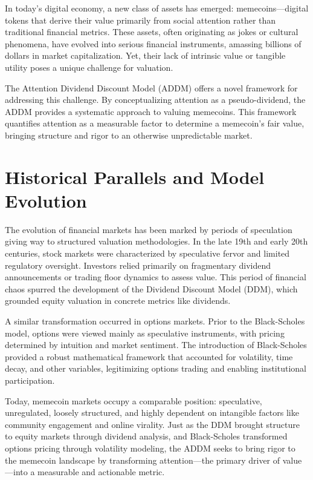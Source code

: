 \documentclass[a4paper,12pt]{article}
\begin{document}
In today's digital economy, a new class of assets has emerged: memecoins—digital tokens that derive their value primarily from social attention rather than traditional financial metrics. These assets, often originating as jokes or cultural phenomena, have evolved into serious financial instruments, amassing billions of dollars in market capitalization. Yet, their lack of intrinsic value or tangible utility poses a unique challenge for valuation.

The Attention Dividend Discount Model (ADDM) offers a novel framework for addressing this challenge. By conceptualizing attention as a pseudo-dividend, the ADDM provides a systematic approach to valuing memecoins. This framework quantifies attention as a measurable factor to determine a memecoin's fair value, bringing structure and rigor to an otherwise unpredictable market.

\section*{Historical Parallels and Model Evolution}

The evolution of financial markets has been marked by periods of speculation giving way to structured valuation methodologies. In the late 19th and early 20th centuries, stock markets were characterized by speculative fervor and limited regulatory oversight. Investors relied primarily on fragmentary dividend announcements or trading floor dynamics to assess value. This period of financial chaos spurred the development of the Dividend Discount Model (DDM), which grounded equity valuation in concrete metrics like dividends.

A similar transformation occurred in options markets. Prior to the Black-Scholes model, options were viewed mainly as speculative instruments, with pricing determined by intuition and market sentiment. The introduction of Black-Scholes provided a robust mathematical framework that accounted for volatility, time decay, and other variables, legitimizing options trading and enabling institutional participation.

Today, memecoin markets occupy a comparable position: speculative, unregulated, loosely structured, and highly dependent on intangible factors like community engagement and online virality. Just as the DDM brought structure to equity markets through dividend analysis, and Black-Scholes transformed options pricing through volatility modeling, the ADDM seeks to bring rigor to the memecoin landscape by transforming attention—the primary driver of value—into a measurable and actionable metric.
\end{document}
